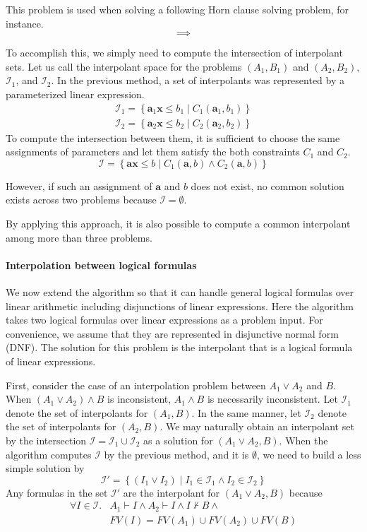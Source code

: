This problem is used when solving a following Horn clause solving
problem, for instance.
\[
\implies
\]

To accomplish this, we simply need to compute the intersection of
interpolant sets.  Let us call the interpolant space for the problems
$\left(A_1, B_1 \right)$ and $\left(A_2, B_2 \right)$,
$\mathcal{I}_1$, and $\mathcal{I}_2$.  In the previous method, a set
of interpolants was represented by a parameterized linear expression.
\begin{align*}
\mathcal{I}_1 = \left\lbrace \mathbf{a}_1 \mathbf{x} \leq b_1 \mid
C_1 (\mathbf{a}_1, b_1 ) \right\rbrace \\
\mathcal{I}_2 = \left\lbrace \mathbf{a}_2 \mathbf{x} \leq b_2 \mid
C_2 (\mathbf{a}_2, b_2 ) \right\rbrace
\end{align*}
To compute the intersection between them, it is sufficient to choose
the same assignments of parameters and let them satisfy the both
constraints $C_1$ and $C_2$.
\[ \mathcal{I} = \left\lbrace \mathbf{a} \mathbf{x} \leq b \mid
C_1(\mathbf{a}, b) \wedge C_2(\mathbf{a}, b) \right\rbrace \]

However, if such an assignment of $\mathbf{a}$ and $b$ does not exist,
no common solution exists across two problems because $\mathcal{I} =
\emptyset$.

By applying this approach, it is also possible to compute a common
interpolant among more than three problems.


\paragraph{Interpolation between logical formulas}
We now extend the algorithm so that it can handle general logical
formulas over linear arithmetic including disjunctions of linear
expressions.  Here the algorithm takes two logical formulas over
linear expressions as a problem input.  For convenience, we assume
that they are represented in disjunctive normal form (DNF).  The
solution for this problem is the interpolant that is a logical formula
of linear expressions.

First, consider the case of an interpolation problem between $A_1 \vee
A_2$ and $B$.  When $(A_1 \vee A_2) \wedge B$ is inconsistent, $A_1
\wedge B$ is necessarily inconsistent.  Let $\mathcal{I}_1$ denote the
set of interpolants for $(A_1, B)$.  In the same manner, let
$\mathcal{I}_2$ denote the set of interpolants for $(A_2, B)$.  We may
naturally obtain an interpolant set by the intersection $\mathcal{I} =
\mathcal{I}_1 \cup \mathcal{I}_2$ as a solution for $(A_1 \vee A_2,
B)$.  When the algorithm computes $\mathcal{I}$ by the previous
method, and it is $\emptyset$, we need to build a less simple solution
by
\[ \mathcal{I}' = \left\lbrace \left( I_1 \vee I_2 \right) \mid
I_1 \in \mathcal{I}_1 \wedge I_2 \in \mathcal{I}_2 \right\rbrace \]
Any formulas in the set $\mathcal{I}'$ are the interpolant for $(A_1
\vee A_2, B)$ because
\begin{align*}
\forall I \in \mathcal{I}. & A_1 \vdash I \wedge A_2 \vdash I \wedge I \nvdash B \wedge \\
& FV(I) = FV(A_1) \cup FV(A_2) \cup FV(B)
\end{align*}

